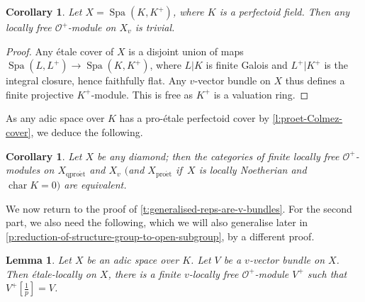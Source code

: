\documentclass[10pt,a4paper]{article}
\newtheorem{Lemma}[thm]{Lemma}
\newtheorem{Corollary}[thm]{Corollary}
\theoremstyle{definition}
\theoremstyle{remark}
\renewcommand{\O}{\mathcal{O}}
\newcommand{\Spa}{\operatorname{Spa}}
\newcommand{\proet}{{\operatorname{pro\acute{e}t}}}
\newcommand{\qproet}{{\operatorname{qpro\acute{e}t}}}
\newcommand{\tf}{[\tfrac{1}{p}]}
\numberwithin{equation}{section}
\begin{document}
\begin{Corollary}\label{c:v-vb-on-Spa(K)}
	Let $X=\Spa(K,K^+)$, where $K$ is a perfectoid field. Then any locally free $\O^+$-module on $X_v$ is trivial.
\end{Corollary}

\begin{proof} 
	Any \'etale cover of $X$ is a disjoint union of maps $\Spa(L,L^+)\to \Spa(K,K^+)$, where $L|K$ is finite Galois and $L^+|K^+$ is the integral closure, hence faithfully flat. Any $v$-vector bundle on $X$ thus defines a finite projective $K^+$-module. This is free as $K^+$ is a valuation ring.
\end{proof}

As any adic space over $K$ has a pro-\'etale perfectoid cover by \cref{l:proet-Colmez-cover}, we deduce the following. 

\begin{Corollary}\label{c:vector-bundles-on-diamonds-different-tops}
	Let $X$ be any diamond; then the categories of finite locally free $\O^+$-modules on $X_{\qproet}$ and  $X_{v}$ $($and $X_{\proet}$ if\, $X$ is locally Noetherian and $\operatorname{char} K=0)$ are equivalent. 
\end{Corollary}

We now return to the proof of \cref{t:generalised-reps-are-v-bundles}. For the second part, we also need the following, which we will also generalise later in \cref{p:reduction-of-structure-group-to-open-subgroup}, by a different proof. 

\begin{Lemma}\label{l:v-bundle-is-et-locally-small}
	Let $X$ be an adic space over $K$. Let $V$ be a $v$-vector bundle on $X$. Then \'etale-locally on $X$, there is a finite $v$-locally  free $\O^+$-module $V^+$ such that $V^+\tf=V$.
\end{Lemma}
\end{document}
